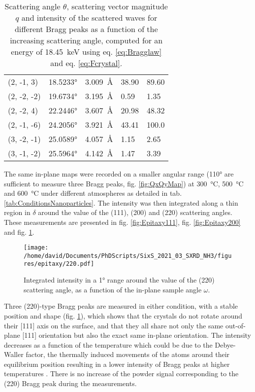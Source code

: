 \begin{table}[htb!]
\begin{minipage}{.45\linewidth}
\begin{tabular}{@{}lllll@{}}
        (2, -1, 3)   & \ang{18.5233} & \qty{3.009}{\angstrom} & \num{38.90} & \num{89.60} \\
        (2, -2, -2)  & \ang{19.6734} & \qty{3.195}{\angstrom} & \num{0.59}  & \num{1.35}  \\
        (2, -2, 4)   & \ang{22.2446} & \qty{3.607}{\angstrom} & \num{20.98} & \num{48.32} \\
        (2, -1, -6)  & \ang{24.2056} & \qty{3.921}{\angstrom} & \num{43.41} & \num{100.0} \\
        (3, -2, -1)  & \ang{25.0589} & \qty{4.057}{\angstrom} & \num{1.15}  & \num{2.65}  \\
        (3, -1, -2)  & \ang{25.5964} & \qty{4.142}{\angstrom} & \num{1.47}  & \num{3.39}  \\
        \bottomrule
        \end{tabular}%
    \end{minipage}%
    \caption{
        Scattering angle $\theta$, scattering vector magnitude $q$ and intensity of the scattered waves for different Bragg peaks as a function of the increasing scattering angle, computed for an energy of \qty{18.45}{\keV} using eq. \ref{eq:Bragglaw} and eq. \ref{eq:Fcrystal}.
    }
    \label{tab:Reflections}
\end{table}

The same in-plane maps were recorded on a smaller angular range (\ang{110} are sufficient to measure three Bragg peaks, fig. \ref{fig:QxQyMap}) at \qty{300}{\degreeCelsius}, \qty{500}{\degreeCelsius} and \qty{600}{\degreeCelsius} under different atmospheres as detailed in tab. \ref{tab:ConditionsNanoparticles}.
The intensity was then integrated along a thin region in $\delta$ around the value of the (111), (200) and (220) scattering angles.
These measurements are presented in fig. \ref{fig:Epitaxy111}, fig. \ref{fig:Epitaxy200} and fig. \ref{fig:Epitaxy220}.

\begin{figure}[!htb]
    \centering
    \texttt{[image: /home/david/Documents/PhDScripts/SixS\_2021\_03\_SXRD\_NH3/figures/epitaxy/220.pdf]}
    \caption{
        Integrated intensity in a \ang{1} range around the value of the (220) scattering angle, as a function of the in-plane sample angle $\omega$.
    }
    \label{fig:Epitaxy220}
\end{figure}

Three (220)-type Bragg peaks are measured in either condition, with a stable position and shape (fig. \ref{fig:Epitaxy220}), which shows that the crystals do not rotate around their [111] axis on the surface, and that they all share not only the same out-of-plane [111] orientation but also the exact same in-plane orientation.
The intensity decreases as a function of the temperature which could be due to the Debye-Waller factor, the thermally induced movements of the atoms around their equilibrium position resulting in a lower intensity of Bragg peaks at higher temperatures \parencite{Willmott}.
There is no increase of the powder signal corresponding to the (220) Bragg peak during the measurements.

